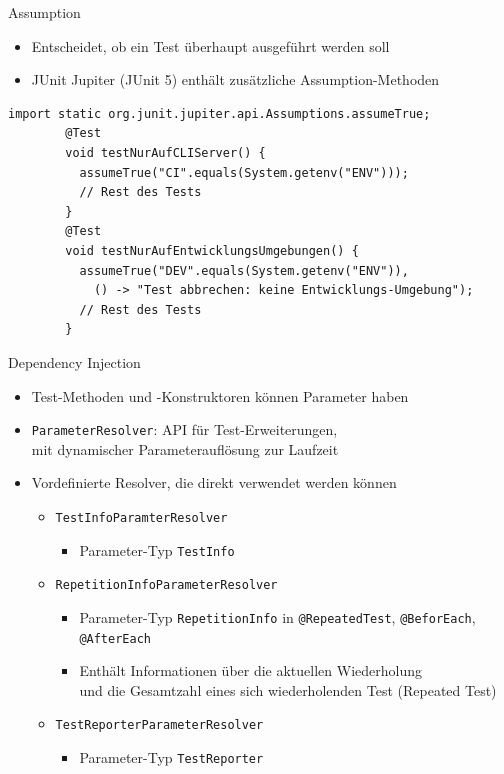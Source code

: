 \documentclass[utf8,t,aspectratio=169]{beamer}
\begin{document}
    \begin{frame}[fragile]{Assumption}
      \begin{itemize}
        \item Entscheidet, ob ein Test überhaupt ausgeführt werden soll
        \item JUnit Jupiter (JUnit 5) enthält zusätzliche Assumption-Methoden
      \end{itemize}
      \begin{lstlisting}[gobble=8]
        import static org.junit.jupiter.api.Assumptions.assumeTrue;
        @Test
        void testNurAufCLIServer() {
          assumeTrue("CI".equals(System.getenv("ENV")));
          // Rest des Tests
        }
        @Test
        void testNurAufEntwicklungsUmgebungen() {
          assumeTrue("DEV".equals(System.getenv("ENV")),
            () -> "Test abbrechen: keine Entwicklungs-Umgebung");
          // Rest des Tests
        }
      \end{lstlisting}
    \end{frame}
    \begin{frame}{Dependency Injection}
      \begin{itemize}
        \item Test-Methoden und -Konstruktoren können Parameter haben
        \item \lstinline|ParameterResolver|: API für Test-Erweiterungen,\\
          mit dynamischer Parameterauflösung zur Laufzeit
        \item Vordefinierte Resolver, die direkt verwendet werden können
          \begin{itemize}
            \item \lstinline|TestInfoParamterResolver|
                \begin{itemize}
                  \item Parameter-Typ \lstinline|TestInfo|
                \end{itemize}
              \item \lstinline|RepetitionInfoParameterResolver|
                \begin{itemize}
                  \item Parameter-Typ \lstinline|RepetitionInfo| in
                    \lstinline|@RepeatedTest|, \lstinline|@BeforEach|,
                    \lstinline|@AfterEach|
                  \item Enthält Informationen über die aktuellen Wiederholung\\
                    und die Gesamtzahl eines sich wiederholenden Test (Repeated
                    Test)
                \end{itemize}
              \item \lstinline|TestReporterParameterResolver|
                \begin{itemize}
                  \item Parameter-Typ \lstinline|TestReporter|
                \end{itemize}
          \end{itemize}
      \end{itemize}
    \end{frame}
\end{document}
